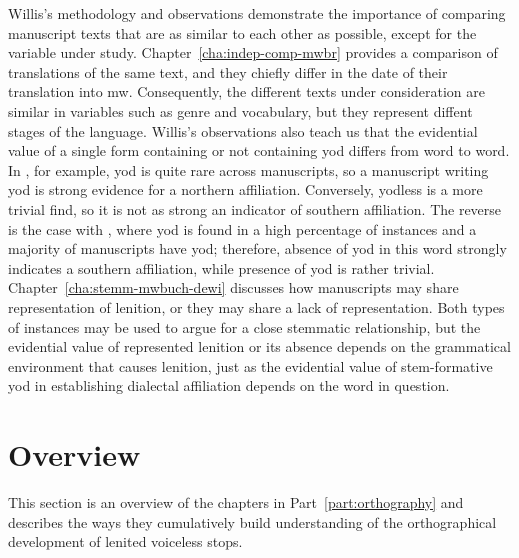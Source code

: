 Willis's methodology and observations demonstrate the importance of comparing  manuscript texts that are as similar to each other as possible, except for the variable under study. Chapter~\ref{cha:indep-comp-mwbr} provides a comparison of translations of the same text, and they chiefly differ in the date of their translation into \gls{mw}. Consequently, the different texts under consideration are similar in variables such as genre and vocabulary, but they represent diffent stages of the language. Willis's observations also teach us that the evidential value of a single form containing or not containing yod  differs from word to word. In , for example, yod is quite rare across manuscripts, so a manuscript writing yod is strong evidence for a northern affiliation. Conversely, yodless  is a more trivial find, so it is not as strong an indicator of southern affiliation. The reverse is the case with , where yod is found in a high percentage of instances and a majority of manuscripts have yod; therefore, absence of yod in this word strongly indicates a southern affiliation, while presence of yod is rather trivial. Chapter~\ref{cha:stemm-mwbuch-dewi} discusses how manuscripts may share representation of lenition, or they may share a lack of representation. Both types of  instances may be used to argue for a close stemmatic relationship, but the evidential value of represented lenition or its absence depends on the grammatical environment that causes lenition, just as the evidential value of stem-formative yod in establishing dialectal affiliation depends on the word in question.

\section{Overview}
\label{sec:overview}

This section is an overview of the chapters in Part~\ref{part:orthography} and describes the ways they  cumulatively build understanding of the orthographical development of lenited voiceless stops.


